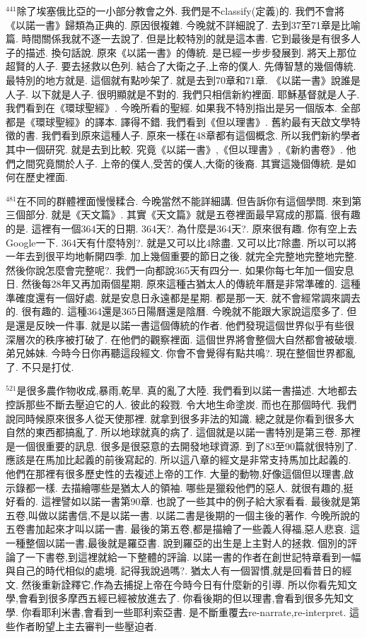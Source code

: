 \documentclass{book}
\begin{document}
$^{441}$除了埃塞俄比亞的一小部分教會之外.
我們是不classify(定義)的.
我們不會將《以諾一書》歸類為正典的.
原因很複雜.
今晚就不詳細說了.
去到37至71章是比喻篇.
時間關係我就不逐一去說了.
但是比較特別的就是這本書.
它到最後是有很多人子的描述.
換句話說.
原來《以諾一書》的傳統.
是已經一步步發展到.
將天上那位超賢的人子.
要去拯救以色列.
結合了大衛之子,上帝的僕人.
先傳智慧的幾個傳統.
最特別的地方就是.
這個就有點吵架了.
就是去到70章和71章.
《以諾一書》說誰是人子.
以下就是人子.
很明顯就是不對的.
我們只相信新約裡面.
耶穌基督就是人子.
我們看到在《環球聖經》.
今晚所看的聖經.
如果我不特別指出是另一個版本.
全部都是《環球聖經》的譯本.
譯得不錯.
我們看到《但以理書》.
舊約最有天啟文學特徵的書.
我們看到原來這種人子.
原來一樣在48章都有這個概念.
所以我們新約學者其中一個研究.
就是去到比較.
究竟《以諾一書》,《但以理書》,《新約書卷》.
他們之間究竟關於人子.
上帝的僕人,受苦的僕人,大衛的後裔.
其實這幾個傳統.
是如何在歷史裡面.

$^{481}$在不同的群體裡面慢慢糅合.
今晚當然不能詳細講.
但告訴你有這個學問.
來到第三個部分.
就是《天文篇》.
其實《天文篇》就是五卷裡面最早寫成的那篇.
很有趣的是.
這裡有一個364天的日期.
364天?.
為什麼是364天?.
原來很有趣.
你有空上去Google一下.
364天有什麼特別?.
就是又可以比4除盡.
又可以比7除盡.
所以可以將一年去到很平均地斬開四季.
加上幾個重要的節日之後.
就完全完整地完整地完整.
然後你說怎麼會完整呢?.
我們一向都說365天有四分一.
如果你每七年加一個安息日.
然後每28年又再加兩個星期.
原來這種古猶太人的傳統年曆是非常準確的.
這種準確度還有一個好處.
就是安息日永遠都是星期.
都是那一天.
就不會經常調來調去的.
很有趣的.
這種364還是365日陽曆還是陰曆.
今晚就不能跟大家說這麼多了.
但是還是反映一件事.
就是以諾一書這個傳統的作者.
他們發現這個世界似乎有些很深層次的秩序被打破了.
在他們的觀察裡面.
這個世界將會整個大自然都會被破壞.
弟兄姊妹.
今時今日你再聽這段經文.
你會不會覺得有點共鳴?.
現在整個世界都亂了.
不只是打仗.

$^{521}$是很多農作物收成,暴雨,乾旱.
真的亂了大陸.
我們看到以諾一書描述.
大地都去控訴那些不斷去壓迫它的人.
彼此的殺戮.
令大地生命塗炭.
而也在那個時代.
我們說同時候原來很多人從天使那裡.
就拿到很多非法的知識.
總之就是你看到很多大自然的東西都搞亂了.
所以地球就真的病了.
這個就是以諾一書特別是第三卷.
那裡是一個很重要的訊息.
很多是很惡意的去開發地球資源.
到了83至90篇就很特別了.
應該是在馬加比起義的前後寫起的.
所以這八章的經文是非常支持馬加比起義的.
他們在那裡有很多歷史性的去複述上帝的工作.
大量的動物,好像這個但以理書,啟示錄都一樣.
去描繪哪些是猶太人的領袖.
哪些是獵殺他們的惡人.
就很有趣的,挺好看的.
這裡譬如以諾一書第90章.
也說了一些其中的例子給大家看看.
最後就是第五卷,叫做以諾書信,不是以諾一書.
以諾二書是後期的一個主後的著作.
今晚所說的五卷書加起來才叫以諾一書.
最後的第五卷,都是描繪了一些義人得福,惡人悲哀.
這一種整個以諾一書,最後就是羅亞書.
說到羅亞的出生是上主對人的拯救.
個別的評論了一下書卷,到這裡就給一下整體的評論.
以諾一書的作者在創世記特章看到一幅與自己的時代相似的處境.
記得我說過嗎?.
猶太人有一個習慣,就是回看昔日的經文.
然後重新詮釋它,作為去捕捉上帝在今時今日有什麼新的引導.
所以你看先知文學,會看到很多摩西五經已經被放進去了.
你看後期的但以理書,會看到很多先知文學.
你看耶利米書,會看到一些耶利索亞書.
是不斷重覆去re-narrate,re-interpret.
這些作者盼望上主去審判一些壓迫者.
\end{document}
